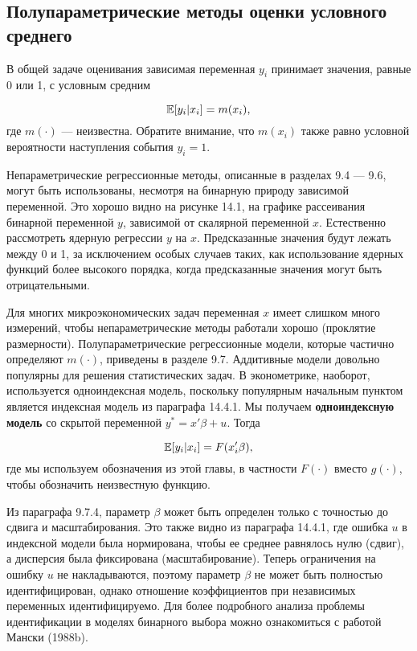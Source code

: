 \subsection{Полупараметрические методы оценки условного среднего}

В общей задаче оценивания зависимая переменная $y_i$ принимает значения,  равные 0 или 1,  с условным средним

\[
\mathbb{E}[y_i |x_i] = m(x_i), 
\] 
где $m(\cdot )$ --- неизвестна. Обратите внимание,  что $m(x_i)$ также равно условной вероятности наступления события $y_i=1$.

Непараметрические регрессионные методы,  описанные в разделах 9.4 --- 9.6,  могут быть использованы,  несмотря на бинарную природу зависимой переменной. Это хорошо видно на рисунке 14.1,  на графике рассеивания бинарной переменной $y$, зависимой от скалярной переменной $x$. Естественно рассмотреть ядерную регрессии $y$ на $x$. Предсказанные  значения будут лежать между 0 и 1,  за исключением особых случаев таких,  как использование ядерных функций более высокого порядка,  когда предсказанные значения могут быть отрицательными.

Для многих микроэкономических задач переменная $x$ имеет слишком много измерений,  чтобы непараметрические методы работали хорошо (проклятие размерности). Полупараметрические регрессионные модели,  которые частично определяют $m(\cdot)$,  приведены в разделе 9.7. Аддитивные модели довольно популярны для решения статистических задач. В эконометрике,  наоборот,  используется одноиндексная модель,  поскольку популярным начальным пунктом является индексная модель из параграфа 14.4.1. Мы получаем \textbf{одноиндексную модель} со скрытой переменной $y^*=x'\beta +u.$ Тогда

\[
\mathbb{E}[y_i| x_i] = F(x'_i\beta), 
\] 
где мы используем обозначения из этой главы, в частности $F(\cdot)$ вместо $g(\cdot)$,  чтобы обозначить неизвестную функцию. 

Из параграфа 9.7.4,  параметр $\beta$ может быть определен только с точностью до сдвига и масштабирования. Это также видно из параграфа 14.4.1,  где ошибка $u$ в индексной модели была нормирована,  чтобы ее среднее равнялось нулю (сдвиг),  а дисперсия была фиксирована (масштабирование). Теперь ограничения на ошибку $u$ не накладываются,  поэтому параметр $\beta$ не может быть полностью идентифицирован,  однако отношение коэффициентов при независимых переменных идентифицируемо. Для  более подробного анализа проблемы идентификации в моделях бинарного выбора можно ознакомиться с работой Мански (1988b).

